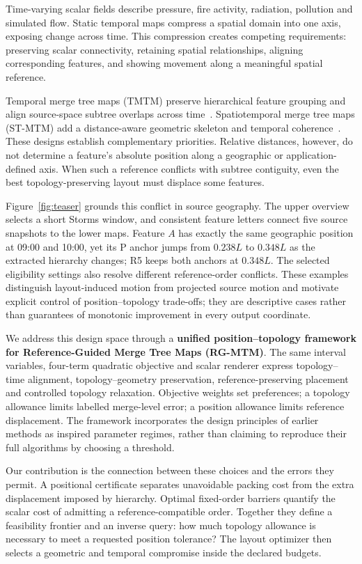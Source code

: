 Time-varying scalar fields describe pressure, fire activity, radiation, pollution and simulated flow. Static temporal maps compress a spatial domain into one axis, exposing change across time. This compression creates competing requirements: preserving scalar connectivity, retaining spatial relationships, aligning corresponding features, and showing movement along a meaningful spatial reference.

Temporal merge tree maps (TMTM) preserve hierarchical feature grouping and align source-space subtree overlaps across time~\cite{Koepp:2023:TMTM}. Spatiotemporal merge tree maps (ST-MTM) add a distance-aware geometric skeleton and temporal coherence~\cite{STMTM:2026}. These designs establish complementary priorities. Relative distances, however, do not determine a feature's absolute position along a geographic or application-defined axis. When such a reference conflicts with subtree contiguity, even the best topology-preserving layout must displace some features.

Figure~\ref{fig:teaser} grounds this conflict in source geography. The upper overview selects a short Storms window, and consistent feature letters connect five source snapshots to the lower maps. Feature $A$ has exactly the same geographic position at 09:00 and 10:00, yet its P anchor jumps from $0.238L$ to $0.348L$ as the extracted hierarchy changes; R5 keeps both anchors at $0.348L$. The selected eligibility settings also resolve different reference-order conflicts. These examples distinguish layout-induced motion from projected source motion and motivate explicit control of position--topology trade-offs; they are descriptive cases rather than guarantees of monotonic improvement in every output coordinate.

We address this design space through a \textbf{unified position--topology framework for Reference-Guided Merge Tree Maps (RG-MTM)}. The same interval variables, four-term quadratic objective and scalar renderer express topology--time alignment, topology--geometry preservation, reference-preserving placement and controlled topology relaxation. Objective weights set preferences; a topology allowance limits labelled merge-level error; a position allowance limits reference displacement. The framework incorporates the design principles of earlier methods as inspired parameter regimes, rather than claiming to reproduce their full algorithms by choosing a threshold.

Our contribution is the connection between these choices and the errors they permit. A positional certificate separates unavoidable packing cost from the extra displacement imposed by hierarchy. Optimal fixed-order barriers quantify the scalar cost of admitting a reference-compatible order. Together they define a feasibility frontier and an inverse query: how much topology allowance is necessary to meet a requested position tolerance? The layout optimizer then selects a geometric and temporal compromise inside the declared budgets.

